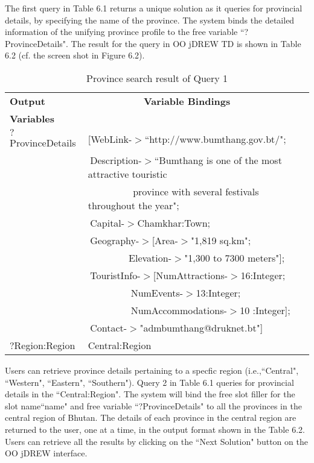 \hspace{0.3in}The first query in Table 6.1 returns a unique solution as it queries for provincial details, by specifying the name of the province. The system binds the detailed information of the unifying province profile to the free variable ``?ProvinceDetails". The result for the query in OO jDREW TD is shown in Table 6.2 (cf. the screen shot in Figure 6.2).	
\begin{table} [tbph]
\caption{Province search result of Query 1}
\centering
\footnotesize
\begin{tabular}{|l|l|}
\hline
 \textbf{Output} &$~~~~~~~~~~~~~~~~~~~~~~~~~~$\textbf{Variable Bindings} \\
 \textbf{Variables}&                \\
\hline
 $?$ProvinceDetails&[WebLink-$>$``http://www.bumthang.gov.bt/";\\
          &$~$Description-$>$``Bumthang is one of the most attractive touristic  \\
        &$~~~~~~~~~~~~~~~~~~~~~$province with several festivals throughout the year";\\
        &$~$Capital-$>$Chamkhar:Town; \\
        &$~$Geography-$>$[Area-$>$"1,819 sq.km";\\
        &$~~~~~~~~~~~~~~~~~~~$Elevation-$>$"1,300 to 7300 meters"];\\
        &$~$TouristInfo-$>$[NumAttractions-$>$16:Integer;\\ 
           &$~~~~~~~~~~~~~~~~~~~~$NumEvents-$>$13:Integer; \\
				   &$~~~~~~~~~~~~~~~~~~~~$NumAccommodations-$>$10 :Integer]; \\
	      &$~$Contact-$>$"admbumthang@druknet.bt"] \\
 \hline
 $?$Region:Region & Central:Region\\
\hline
\end{tabular} 
\end{table}

\hspace{0.3in}Users can retrieve province details pertaining to a specfic region (i.e.,``Central", ``Western", ``Eastern", ``Southern"). Query 2 in Table 6.1 queries for provincial details in the ``Central:Region". The system will bind the free slot filler for the slot name``name" and free variable ``?ProvinceDetails" to all the provinces in the central region of Bhutan. The details of each province in the central region are returned to the user, one at a time, in the output format shown in the Table 6.2. Users can retrieve all the results by clicking on the ``Next Solution" button on the OO jDREW interface.

